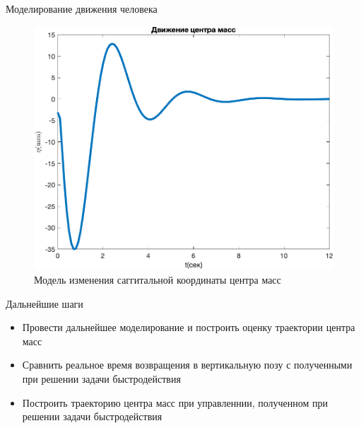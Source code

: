 \documentclass[10pt]{beamer}
\begin{document}
\begin{frame}{Моделирование движения человека}
	\begin{figure}[h!]
		\includegraphics[width=0.7\linewidth]{images/cm_my_1.png}
		\caption{Модель изменения саггитальной координаты центра масс}
	\end{figure}
\end{frame}

\begin{frame}{Дальнейшие шаги}
	\begin{itemize}
		\item Провести дальнейшее моделирование и построить оценку траектории центра масс
		\item Сравнить реальное время возвращения в вертикальную позу с полученными при решении задачи быстродействия
		\item Построить траекторию центра масс при управленнии, полученном при решении задачи быстродействия
	  \end{itemize}
	
\end{frame}
\end{document}
